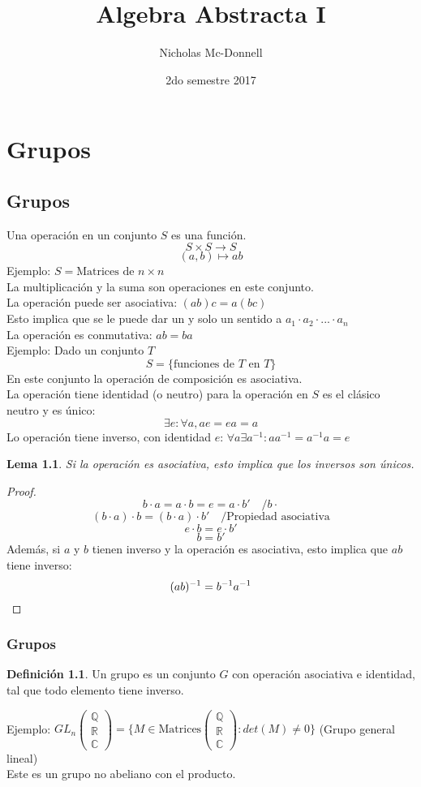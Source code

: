 \documentclass[11pt]{book}
\title{Algebra Abstracta I}
\author{Nicholas Mc-Donnell}
\date{2do semestre 2017}
\newtheorem{lem}[thm]{Lema}
\theoremstyle{definition}
\newtheorem{defn}{Definición}[section]
\begin{document}
\maketitle

\newpage
\tableofcontents

\chapter{Grupos}
\section{Grupos}
Una operación en un conjunto $S$ es una función.
\[
S\times S\rightarrow S
\]
\[
(a,b)\mapsto ab
\]
Ejemplo: $S= \textrm{Matrices de } n\times n$\\
La multiplicación y la suma son operaciones en este conjunto.\\
La operación puede ser asociativa: $(ab)c=a(bc)$\\
Esto implica que se le puede dar un y solo un sentido a $a_1\cdot a_2\cdot...\cdot a_n$\\
La operación es conmutativa: $ab=ba$\\
Ejemplo: Dado un conjunto $T$
\[S=\{ \textrm{funciones de } T\textrm{ en } T\}\]
En este conjunto la operación de composición es asociativa.\\
La operación tiene identidad (o neutro) para la operación en $S$ es el clásico neutro y es único:
\[
\exists e: \forall a, ae=ea=a
\]
Lo operación tiene inverso, con identidad $e$: $\forall a \exists a^{-1}: aa^{-1}=a^{-1}a=e$
\begin{lem}
Si la operación es asociativa, esto implica que los inversos son únicos.
\end{lem}
\begin{proof}

\[
b\cdot a =a\cdot b=e=a\cdot b'\quad / b\cdot
\]
\[
(b\cdot a)\cdot b=(b\cdot a)\cdot b' \quad /\textrm{Propiedad asociativa}
\]
\[
e\cdot b= e\cdot b'
\]
\[
b=b'
\]
Además, si $a$ y $b$ tienen inverso y la operación es asociativa, esto implica que $ab$ tiene inverso:
\[
(ab)^{-1}=b^{-1}a^{-1} \qedhere
\]
\end{proof}
\subsection{Grupos}
\begin{defn}
Un grupo es un conjunto $G$ con operación asociativa e identidad, tal que todo elemento tiene inverso.
\end{defn}
Ejemplo:  $GL_n\begin{pmatrix}\mathbb{Q} \\ \mathbb{R} \\ \mathbb{C} \end{pmatrix}=\{M\in\textrm{Matrices}\begin{pmatrix}\mathbb{Q} \\ \mathbb{R} \\ \mathbb{C} \end{pmatrix}:det(M)\neq 0\}$ (Grupo general lineal)\\
Este es un grupo no abeliano con el producto.
\end{document}

